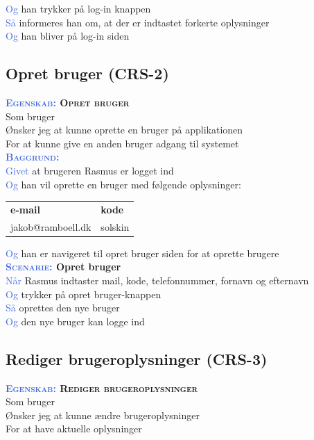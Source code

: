 \textcolor{RoyalBlue}{Og} han trykker på log-in knappen\\
\textcolor{RoyalBlue}{Så} informeres han om, at der er indtastet forkerte oplysninger\\
\textcolor{RoyalBlue}{Og} han bliver på log-in siden \\

\subsection{Opret bruger (CRS-2)} \label{sec:USOpretBruger}
\textbf{\textsc{\textcolor{RoyalBlue}{Egenskab:} Opret bruger}} \\
Som bruger\\
Ønsker jeg at kunne oprette en bruger på applikationen\\
For at kunne give en anden bruger adgang til systemet \\

\textcolor{RoyalBlue}{\textbf{\textsc{Baggrund:}}}\\
\textcolor{RoyalBlue}{Givet} at brugeren Rasmus er logget ind \\
\textcolor{RoyalBlue}{Og} han vil oprette en bruger med følgende oplysninger:\\
\begin{tabular}{| l | l |}
	\textbf{e-mail} & \textbf{kode} \\
	jakob@ramboell.dk & solskin\\
\end{tabular}
\newline \newline
\textcolor{RoyalBlue}{Og} han er navigeret til opret bruger siden for at oprette brugere  \\

\textbf{\textsc{\textcolor{RoyalBlue}{Scenarie:}} Opret bruger}\\
\textcolor{RoyalBlue}{Når} Rasmus indtaster mail, kode, telefonnummer, 
fornavn og efternavn \\
\textcolor{RoyalBlue}{Og} trykker på opret bruger-knappen\\
\textcolor{RoyalBlue}{Så} oprettes den nye bruger\\
\textcolor{RoyalBlue}{Og} den nye bruger kan logge ind\\

\subsection{Rediger brugeroplysninger (CRS-3)} \label{sec:USRedigerBruger}
\textbf{\textsc{\textcolor{RoyalBlue}{Egenskab:} Rediger brugeroplysninger}}\\
Som bruger\\
Ønsker jeg at kunne ændre brugeroplysninger\\
For at have aktuelle oplysninger

